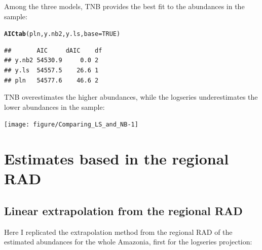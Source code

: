 \documentclass[12pt, A4]{article}\usepackage[]{graphicx}\usepackage[]{color}
\makeatletter
\newcommand{\hlnum}[1]{\textcolor[rgb]{0.686,0.059,0.569}{#1}}%
\newcommand{\hlstd}[1]{\textcolor[rgb]{0.345,0.345,0.345}{#1}}%
\newcommand{\hlkwc}[1]{\textcolor[rgb]{0.333,0.667,0.333}{#1}}%
\newcommand{\hlkwd}[1]{\textcolor[rgb]{0.737,0.353,0.396}{\textbf{#1}}}%
\newenvironment{kframe}{%
 \def\at@end@of@kframe{}%
 \ifinner\ifhmode%
  \def\at@end@of@kframe{\end{minipage}}%
  \begin{minipage}{\columnwidth}%
 \fi\fi%
 \def\FrameCommand##1{\hskip\@totalleftmargin \hskip-\fboxsep
 \colorbox{shadecolor}{##1}\hskip-\fboxsep
     \hskip-\linewidth \hskip-\@totalleftmargin \hskip\columnwidth}%
 \MakeFramed {\advance\hsize-\width
   \@totalleftmargin\z@ \linewidth\hsize
   \@setminipage}}%
 {\par\unskip\endMakeFramed%
 \at@end@of@kframe}
\newenvironment{knitrout}{}{} %
\makeatother
\begin{document}
Among the three models, TNB
provides the best fit to the abundances in the sample:

 
\begin{knitrout}
\color{fgcolor}\begin{kframe}
\begin{alltt}
\hlkwd{AICtab}\hlstd{(pln, y.nb2, y.ls,} \hlkwc{base}\hlstd{=}\hlnum{TRUE}\hlstd{)}
\end{alltt}
\begin{verbatim}
##       AIC     dAIC    df
## y.nb2 54530.9     0.0 2 
## y.ls  54557.5    26.6 1 
## pln   54577.6    46.6 2
\end{verbatim}
\end{kframe}
\end{knitrout}

TNB overestimates the higher abundances, while the logseries
underestimates the lower abundances in the sample:

\begin{knitrout}
\color{fgcolor}

{\centering \texttt{[image: figure/Comparing\_LS\_and\_NB-1]} 

}



\end{knitrout}

\section{Estimates based in the regional RAD}

\subsection*{Linear extrapolation from the regional RAD}

Here I replicated the extrapolation method from the regional RAD of the
estimated abundances for the whole Amazonia, first for the logseries projection:
\end{document}
